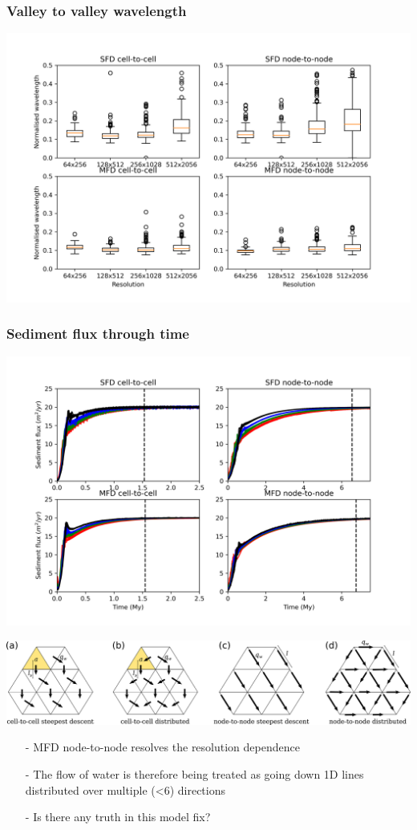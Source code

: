 \documentclass[aspectratio=169]{beamer}
\begin{document}
\begin{frame}
    \frametitle{Valley to valley wavelength}
    \centering
    \includegraphics[height=0.9\paperheight]{./figures/wavelength.png}
\end{frame}

\begin{frame}
    \frametitle{Sediment flux through time}
    \centering
    \includegraphics[height=0.9\paperheight]{./figures/sediment-flux.png}
\end{frame}

\begin{frame}
    \includegraphics[width=0.8\paperwidth]{./figures/MFDandSFD.png}
    \begin{itemize}
        \item[-]{MFD node-to-node resolves the resolution dependence}
        \item[-]{The flow of water is therefore being treated as going down 1D lines distributed over multiple (<6) directions}
        \item[-]{Is there any truth in this model fix?}
    \end{itemize}
\end{frame}
\end{document}
